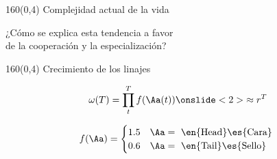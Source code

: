 \documentclass[shownotes,aspectratio=169]{beamer}
\begin{document}
\begin{frame}[plain]
\begin{textblock}{160}(0,4)
 \centering \LARGE Complejidad actual de la vida
\end{textblock}
\vspace{1.5cm} \centering \Large 

¿Cómo se explica esta tendencia a favor  \\ de la cooperación y la especialización?

\end{frame}


\begin{frame}[plain]
\begin{textblock}{160}(0,4)
 \centering \LARGE
Crecimiento de los linajes
\end{textblock}
\vspace{1cm}

\begin{equation*} 
\omega(T) = \prod_t^T f(\Aa(t)) \onslide<2>{\approx r^T }
\end{equation*}

\vspace{0.3cm}

\begin{equation*}
f(\Aa) =
\begin{cases}
 1.5 & \Aa = \text{ \en{Head}\es{Cara} } \\
 0.6 & \Aa = \text{ \en{Tail}\es{Sello} }
\end{cases}
\end{equation*}

\pause \centering \vspace{1cm} 


\end{frame}
\end{document}
